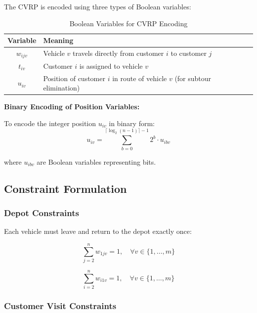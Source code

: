 \documentclass[12pt,a4paper]{article}
\theoremstyle{definition}
\begin{document}
The CVRP is encoded using three types of Boolean variables:

\begin{table}[H]
\centering
\begin{tabular}{|c|p{8cm}|}
\hline
\textbf{Variable} & \textbf{Meaning} \\
\hline
$w_{ijv}$ & Vehicle $v$ travels directly from customer $i$ to customer $j$ \\
\hline
$t_{iv}$ & Customer $i$ is assigned to vehicle $v$ \\
\hline
$u_{iv}$ & Position of customer $i$ in route of vehicle $v$ (for subtour elimination) \\
\hline
\end{tabular}
\caption{Boolean Variables for CVRP Encoding}
\end{table}

\textbf{Binary Encoding of Position Variables:}

To encode the integer position $u_{iv}$ in binary form:
\begin{equation}
u_{iv} = \sum_{b=0}^{\lceil\log_2(n-1)\rceil - 1} 2^b \cdot u_{ibv}
\end{equation}

where $u_{ibv}$ are Boolean variables representing bits.

\subsection{Constraint Formulation}

\subsubsection{Depot Constraints}

Each vehicle must leave and return to the depot exactly once:

\begin{equation}
\sum_{j=2}^{n} w_{1jv} = 1, \quad \forall v \in \{1, \ldots, m\} \tag{C1: Leave depot}
\end{equation}

\begin{equation}
\sum_{i=2}^{n} w_{i1v} = 1, \quad \forall v \in \{1, \ldots, m\} \tag{C2: Return to depot}
\end{equation}

\subsubsection{Customer Visit Constraints}
\end{document}
